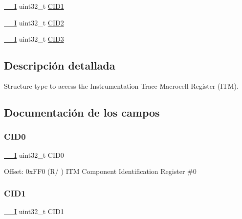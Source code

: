 \begin{DoxyCompactItemize}
\item 
\mbox{\hyperlink{core__cm3_8h_af63697ed9952cc71e1225efe205f6cd3}{\+\_\+\+\_\+I}} uint32\+\_\+t \mbox{\hyperlink{struct_i_t_m___type_a67f499e16728f744c73dad3784d898d7}{C\+I\+D1}}
\item 
\mbox{\hyperlink{core__cm3_8h_af63697ed9952cc71e1225efe205f6cd3}{\+\_\+\+\_\+I}} uint32\+\_\+t \mbox{\hyperlink{struct_i_t_m___type_ab36bf4236041f727b3e5cf2cfaa2aa04}{C\+I\+D2}}
\item 
\mbox{\hyperlink{core__cm3_8h_af63697ed9952cc71e1225efe205f6cd3}{\+\_\+\+\_\+I}} uint32\+\_\+t \mbox{\hyperlink{struct_i_t_m___type_acb2fedfd1da6ff2a57d25fec513ffe25}{C\+I\+D3}}
\end{DoxyCompactItemize}


\subsection{Descripción detallada}
Structure type to access the Instrumentation Trace Macrocell Register (I\+TM). 

\subsection{Documentación de los campos}
\mbox{\label{struct_i_t_m___type_ad613e91338bb994bde578b1a2fcbc1ec}} 
\subsubsection{\texorpdfstring{C\+I\+D0}{CID0}}
{\footnotesize\ttfamily \mbox{\hyperlink{core__cm3_8h_af63697ed9952cc71e1225efe205f6cd3}{\+\_\+\+\_\+I}} uint32\+\_\+t C\+I\+D0}

Offset\+: 0x\+F\+F0 (R/ ) I\+TM Component Identification Register \#0 \mbox{\label{struct_i_t_m___type_a67f499e16728f744c73dad3784d898d7}} 
\subsubsection{\texorpdfstring{C\+I\+D1}{CID1}}
{\footnotesize\ttfamily \mbox{\hyperlink{core__cm3_8h_af63697ed9952cc71e1225efe205f6cd3}{\+\_\+\+\_\+I}} uint32\+\_\+t C\+I\+D1}

